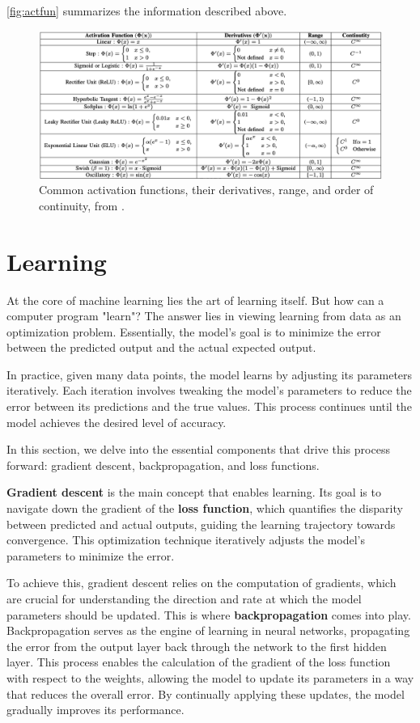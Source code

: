 \documentclass{article}
\begin{document}
\autoref{fig:actfun} summarizes the information described above.
\begin{figure}[]
  \includegraphics{ActFunTable}
  \caption{Common activation functions, their derivatives, range, and order of continuity, from \cite{jagtap2022important}.}
\label{fig:actfun}
\end{figure}

\section{Learning}
  \label{sec:Learning}

  At the core of machine learning lies the art of learning itself. But how can a computer program "learn"? The answer lies in viewing learning from data as an optimization problem. Essentially, the model's goal is to minimize the error between the predicted output and the actual expected output.

 In practice, given many data points, the model learns by adjusting its parameters iteratively. Each iteration involves tweaking the model's parameters to reduce the error between its predictions and the true values. This process continues until the model achieves the desired level of accuracy.

In this section, we delve into the essential components that drive this process forward: gradient descent, backpropagation, and loss functions.

\textbf{Gradient descent} is the main concept that enables learning. Its goal is to navigate down the gradient of the \textbf{loss function}, which quantifies the disparity between predicted and actual outputs, guiding the learning trajectory towards convergence. This optimization technique iteratively adjusts the model’s parameters to minimize the error.

To achieve this, gradient descent relies on the computation of gradients, which are crucial for understanding the direction and rate at which the model parameters should be updated. This is where \textbf{backpropagation} comes into play. Backpropagation serves as the engine of learning in neural networks, propagating the error from the output layer back through the network to the first hidden layer. This process enables the calculation of the gradient of the loss function with respect to the weights, allowing the model to update its parameters in a way that reduces the overall error. By continually applying these updates, the model gradually improves its performance.
\end{document}
